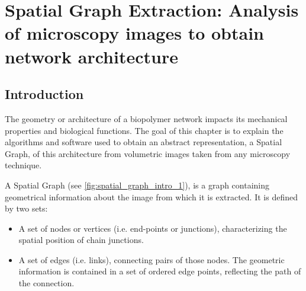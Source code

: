 
\chapter{Spatial Graph Extraction: Analysis of microscopy images to obtain network architecture} %

\label{Chapter-Image} %


\section{Introduction}%
\label{sec:introduction}

The geometry or architecture of a biopolymer network impacts its mechanical
properties and biological functions.
The goal of this chapter is to explain the algorithms and software used to
obtain an abstract representation, a \gls{Spatial Graph}, of this architecture from volumetric images taken from any microscopy technique.

A \gls{Spatial Graph} (see \autoref{fig:spatial_graph_intro_1}), is a graph containing geometrical information about the image from which it is extracted. It is defined by two sets:
\begin{itemize}[topsep=0pt]
  \item A set of nodes or vertices (i.e. end-points or junctions), characterizing the spatial position of chain junctions.
  \item A set of edges (i.e. links), connecting pairs of those nodes. The geometric information is contained in a set of ordered edge points, reflecting the path of the connection.
\end{itemize}


